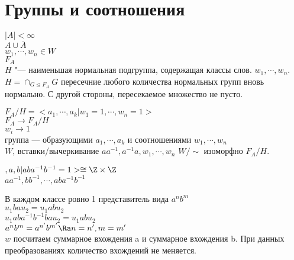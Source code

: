 ﻿\section{Группы и соотношения}
$|A| < \infty$\\
$A \cup \bar{A}$\\
$w_1, \cdots,w_n \in W$\\
$F_A$\\
$H$ "--- наименьшая нормальная подгруппа, содержащая классы слов. 
$w_1, \cdots, w_n$.
$H = \cap_{G \unlhd F_A} G$ пересечние любого количества нормальных
групп вновь нормально. 
С другой стороны, пересекаемое множество не пусто. 

$F_A/H = <a_1, \cdots, a_k|w_1 = 1, \cdots, w_n = 1>$\\
$F_A \to F_A/H$\\
$w_i \to 1$ \\
группа --- образующими $a_1, \cdots, a_k$ и соотношениями $w_1, \cdots, w_n$\\

$W$, вставки/вычеркивание $aa^{-1}, a^{-1}a, w_1, \cdots, w_n$ 
$W/\sim$ изоморфно $F_A/H$.

\begin{exmp}
$,a, b| aba^{-1}b^{-1} = 1> \cong \Z \times \Z$\\
$aa^{-1}, bb^{-1}, \cdots, aba^{-1}b^{-1}$

В каждом классе ровно 1 представитель вида $a^nb^m$\\
$u_1bau_2 = u_1abu_2$\\
$u_1aba^{-1}b^{-1}bau_2 = u_1abu_2$\\

$a^nb^m = a^{n'}b^{m'} \Ra n = n', m = m'$\\
$w$ посчитаем суммарное вхождения a и суммарное вхождения b.
При данных преобразованиях количество вхождений не меняется.  
\end{exmp}